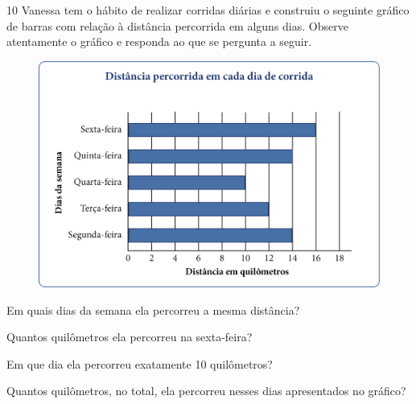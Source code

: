 \begin{mdframed}[linewidth=2pt,linecolor=salmao,roundcorner=2pt]
\vspace{10cm}
\end{mdframed}

\num{10} Vanessa tem o hábito de realizar corridas diárias e construiu o seguinte
gráfico de barras com relação à distância percorrida em alguns dias. Observe atentamente o gráfico e responda ao que se pergunta a seguir.

\begin{figure}[htpb!]
\centering
\includegraphics[width=\textwidth]{media/image49.png}
\end{figure}

\begin{escolha}
\item
  Em quais dias da semana ela percorreu a mesma distância?


\item
  Quantos quilômetros ela percorreu na sexta-feira?


\item
  Em que dia ela percorreu exatamente 10 quilômetros?


\item
  Quantos quilômetros, no total, ela percorreu nesses dias apresentados no gráfico?

\end{escolha}


